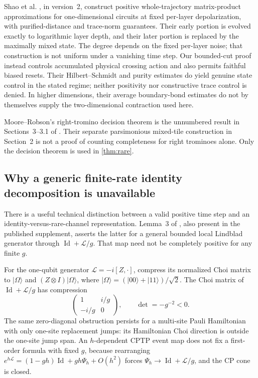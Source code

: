 \documentclass[11pt,reqno]{amsart}
\numberwithin{equation}{section}
\theoremstyle{definition}
\theoremstyle{remark}
\newcommand{\Id}{\operatorname{Id}}
\newcommand{\ket}[1]{\lvert#1\rangle}
\newcommand{\cL}{\mathcal L}
\begin{document}
Shao et al. \cite[Propositions~1 and~4, Corollary~3]{Shao}, in version~2, construct positive whole-trajectory matrix-product approximations for one-dimensional circuits at fixed per-layer depolarization, with purified-distance and trace-norm guarantees. Their early portion is evolved exactly to logarithmic layer depth, and their later portion is replaced by the maximally mixed state. The degree depends on the fixed per-layer noise; that construction is not uniform under a vanishing time step. Our bounded-cut proof instead controls accumulated physical crossing action and also permits faithful biased resets. Their Hilbert--Schmidt and purity estimates do yield genuine state control in the stated regime; neither positivity nor constructive trace control is denied. In higher dimensions, their average boundary-bond estimates do not by themselves supply the two-dimensional contraction used here.

Moore--Robson's right-tromino decision theorem is the unnumbered result in Sections~3--3.1 of \cite{MR}. Their separate parsimonious mixed-tile construction in Section~2 is not a proof of counting completeness for right trominoes alone. Only the decision theorem is used in \cref{thm:rare}.

\subsection{Why a generic finite-rate identity decomposition is unavailable}
There is a useful technical distinction between a valid positive time step and an identity-versus-rare-channel representation. Lemma~3 of \cite[arXiv version~2]{TC}, also present in the published supplement, asserts the latter for a general bounded local Lindblad generator through $\Id+\cL/g$. That map need not be completely positive for any finite $g$.

For the one-qubit generator $\cL=-i[Z,\cdot]$, compress its normalized Choi matrix to $\ket\Omega$ and $(Z\otimes I)\ket\Omega$, where $\ket\Omega=(\ket{00}+\ket{11})/\sqrt2$. The Choi matrix of $\Id+\cL/g$ has compression
\begin{equation}\label{eq:choi}
 \begin{pmatrix}1&i/g\\-i/g&0\end{pmatrix},
 \qquad\det=-g^{-2}<0.
\end{equation}
The same zero-diagonal obstruction persists for a multi-site Pauli Hamiltonian with only one-site replacement jumps: its Hamiltonian Choi direction is outside the one-site jump span. An $h$-dependent CPTP event map does not fix a first-order formula with fixed $g$, because rearranging
$e^{h\cL}=(1-gh)\Id+gh\Psi_h+O(h^2)$ forces $\Psi_h\to\Id+\cL/g$, and the CP cone is closed.
\end{document}
